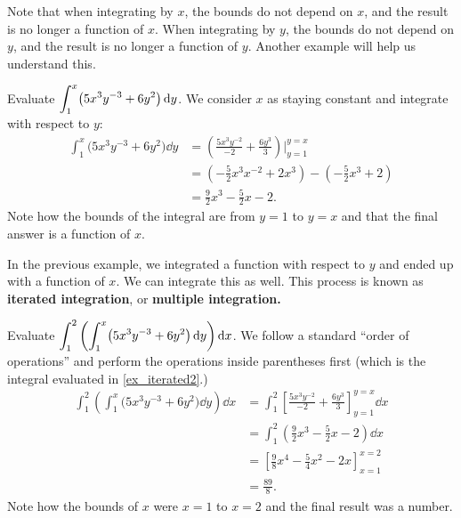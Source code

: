 Note that when integrating by $x$, the bounds do not depend on $x$, and the result is no longer a function of $x$.  When integrating by $y$, the bounds do not depend on $y$, and the result is no longer a function of $y$. Another example will help us understand this.

\begin{example}\label{ex_iterated2}%
Evaluate $\displaystyle \int_1^x\bigl(5x^3y^{-3}+6y^2\bigr)\operatorname{d}\! y$.
\solution
We consider $x$ as staying constant and integrate with respect to $y$:
\begin{align*}
\int_1^x\bigl(5x^3y^{-3}+6y^2\bigr)\dd y & = \left(\frac{5x^3y^{-2}}{-2}+\frac{6y^3}{3}\right)\Bigg|_{y=1}^{y=x} \\
						&= \left(-\frac52x^3x^{-2}+2x^3\right) - \left(-\frac52x^3+2\right) \\
						&= \frac92x^3-\frac52x-2.
\end{align*}
Note how the bounds of the integral are from $y=1$ to $y=x$ and that the final answer is a function of $x$.
\end{example}

In the previous example, we integrated a function with respect to $y$ and ended up with a function of $x$. We can integrate this as well. This process is known as \textbf{iterated integration}, or \textbf{multiple integration.}


\begin{example}\label{ex_iterated3}%
Evaluate $\displaystyle \int_1^2\left(\int_1^x\bigl(5x^3y^{-3}+6y^2\bigr)\operatorname{d}\! y\right)\operatorname{d}\! x$.
\solution
We follow a standard ``order of operations'' and perform the operations inside parentheses first (which is the integral evaluated in \autoref{ex_iterated2}.)
\begin{align*}
\int_1^2\left(\int_1^x\bigl(5x^3y^{-3}+6y^2\bigr)\dd y\right)\dd x
	&= \int_1^2 \left[\frac{5x^3y^{-2}}{-2}+\frac{6y^3}{3}\right]_{y=1}^{y=x}\dd x \\
	&= \int_1^2 \left(\frac92x^3-\frac52x-2\right)\dd x \\
	&= \left[\frac98x^4-\frac54x^2-2x\right]_{x=1}^{x=2}\\
	&= \frac{89}8.
\end{align*}
Note how the bounds of $x$ were $x=1$ to $x=2$ and the final result was a number.
\end{example}

